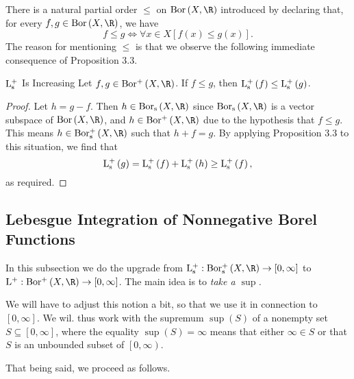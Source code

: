 \documentclass[pmath450]{subfiles}
\begin{document}
    \np There is a natural partial order $\leq$ on $\bor\left( X,\R \right)$ introduced by declaring that, for every $f,g\in\bor\left( X,\R \right)$, we have
    \begin{equation*}
        f\leq g \iff \forall x\in X\left[ f\left( x \right)\leq g\left( x \right) \right].
    \end{equation*}
    The reason for mentioning $\leq$ is that we observe the following immediate consequence of Proposition 3.3.

    \begin{cor}{$\operatorname{L^+_s}$ Is Increasing}
        Let $f,g\in\borplus\left( X,\R \right)$. If $f\leq g$, then $\operatorname{L^+_s}\left( f \right)\leq\operatorname{L^+_s}\left( g \right)$.
    \end{cor}	

    \begin{proof}
        Let $h=g-f$. Then $h\in\bors\left( X,\R \right)$ since $\bors\left( X,\R \right)$ is a vector subspace of $\bor\left( X,\R \right)$, and $h\in\borplus\left( X,\R \right)$ due to the hypothesis that $f\leq g$. This means $h\in\borpluss\left( X,\R \right)$ such that $h+f=g$. By applying Proposition 3.3 to this situation, we find that
        \begin{equation*}
            \operatorname{L^+_s}\left( g \right)=\operatorname{L^+_s}\left( f \right)+\operatorname{L^+_s}\left( h \right)\geq\operatorname{L^+_s}\left( f \right),
        \end{equation*}
        as required.
    \end{proof}

    \subsection{Lebesgue Integration of Nonnegative Borel Functions}
    
    In this subsection we do the upgrade from $\lpluss:\borpluss\left( X,\R \right)\to\left[ 0,\infty \right]$ to $\lplus:\borplus\left( X,\R \right)\to\left[ 0,\infty \right]$. The main idea is to \textit{take a $\sup$.}

    We will have to adjust this notion a bit, so that we use it in connection to $\left[ 0,\infty \right]$. We wil. thus work with the supremum $\sup\left( S \right)$ of a nonempty set $S\subseteq\left[ 0,\infty \right]$, where the equality $\sup\left( S \right)=\infty$ means that either $\infty\in S$ or that $S$ is an unbounded subset of $\left[ 0,\infty \right)$.

    That being said, we proceed as follows.
\end{document}
